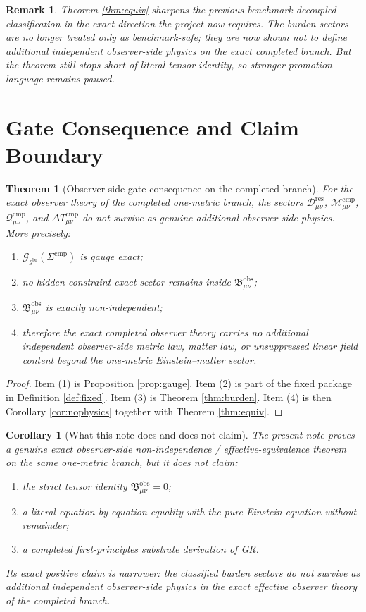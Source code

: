 \documentclass[11pt]{article}
\newcommand{\ObserverMetric}{g^{\mathrm{br}}}
\newcommand{\CompShift}{\Sigma^{\mathrm{cmp}}}
\newcommand{\ResidualDec}{\mathcal D_{\mu\nu}^{\mathrm{res}}}
\newcommand{\GaugeBook}{\mathcal G_{\ObserverMetric}}
\newcommand{\CompMix}{\mathcal M_{\mu\nu}^{\mathrm{cmp}}}
\newcommand{\CompQuad}{\mathcal Q_{\mu\nu}^{\mathrm{cmp}}}
\newcommand{\DeltaTComp}{\Delta T_{\mu\nu}^{\mathrm{cmp}}}
\newcommand{\ObsBurden}{\mathfrak B_{\mu\nu}^{\mathrm{obs}}}
\newtheorem{remark}{Remark}
\newtheorem{corollary}{Corollary}
\newtheorem{theorem}{Theorem}
\begin{document}
\begin{remark}
Theorem \ref{thm:equiv} sharpens the previous benchmark-decoupled classification in the exact direction the project now requires. The burden sectors are no longer treated only as benchmark-safe; they are now shown not to define additional independent observer-side physics on the exact completed branch. But the theorem still stops short of literal tensor identity, so stronger promotion language remains paused.
\end{remark}

\section{Gate Consequence and Claim Boundary}

\begin{theorem}[Observer-side gate consequence on the completed branch]
\label{thm:gate}
For the exact observer theory of the completed one-metric branch, the sectors \(\ResidualDec\), \(\CompMix\), \(\CompQuad\), and \(\DeltaTComp\) do not survive as genuine additional observer-side physics. More precisely:
\begin{enumerate}
    \item \(\GaugeBook(\CompShift)\) is gauge exact;
    \item no hidden constraint-exact sector remains inside \(\ObsBurden\);
    \item \(\ObsBurden\) is exactly non-independent;
    \item therefore the exact completed observer theory carries no additional independent observer-side metric law, matter law, or unsuppressed linear field content beyond the one-metric Einstein--matter sector.
\end{enumerate}
\end{theorem}

\begin{proof}
Item (1) is Proposition \ref{prop:gauge}. Item (2) is part of the fixed package in Definition \ref{def:fixed}. Item (3) is Theorem \ref{thm:burden}. Item (4) is then Corollary \ref{cor:nophysics} together with Theorem \ref{thm:equiv}.
\end{proof}

\begin{corollary}[What this note does and does not claim]
\label{cor:scope}
The present note proves a genuine exact observer-side non-independence / effective-equivalence theorem on the same one-metric branch, but it does not claim:
\begin{enumerate}
    \item the strict tensor identity \(\ObsBurden=0\);
    \item a literal equation-by-equation equality with the pure Einstein equation without remainder;
    \item a completed first-principles substrate derivation of GR.
\end{enumerate}
Its exact positive claim is narrower: the classified burden sectors do not survive as additional independent observer-side physics in the exact effective observer theory of the completed branch.
\end{corollary}
\end{document}
